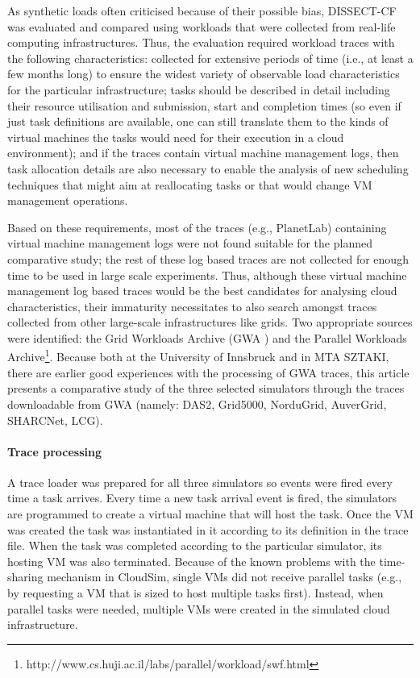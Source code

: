 \documentclass[sort, compress, 5p]{elsarticle}
\begin{document}
As synthetic loads often criticised because of their possible bias, DISSECT-CF was evaluated and compared using workloads that were collected from real-life computing infrastructures. Thus, the evaluation required workload traces with the following characteristics:  collected for extensive periods of time (i.e., at least a few months long) to ensure the widest variety of observable load characteristics for the particular infrastructure;  tasks should be described in detail including their resource utilisation and submission, start and completion times (so even if just task definitions are available, one can still translate them to the kinds of virtual machines the tasks would need for their execution in a cloud environment); and  if the traces contain virtual machine management logs, then task allocation details are also necessary to enable the analysis of new scheduling techniques that might aim at reallocating tasks or that would change VM management operations.

Based on these requirements, most of the traces (e.g., PlanetLab) containing virtual machine management logs were not found suitable for the planned comparative study; the rest of these log based traces are not collected for enough time to be used in large scale experiments. Thus, although these virtual machine management log based traces would be the best candidates for analysing cloud characteristics, their immaturity necessitates to also search amongst traces collected from other large-scale infrastructures like grids. Two appropriate sources were identified: the Grid Workloads Archive (GWA \cite{Iosup08thegrid}) and the Parallel Workloads Archive\footnote{http://www.cs.huji.ac.il/labs/parallel/workload/swf.html}. Because both at the University of Innsbruck and in MTA SZTAKI, there are earlier good experiences with the processing of GWA traces, this article presents a comparative study of the three selected simulators through the traces downloadable from GWA (namely: DAS2, Grid5000, NorduGrid, AuverGrid, SHARCNet, LCG). 

\paragraph{Trace processing} A trace loader was prepared for all three simulators so events were fired every time a task arrives. Every time a new task arrival event is fired, the simulators are programmed to create a virtual machine that will host the task. Once the VM was created the task was instantiated in it according to its definition in the trace file. When the task was completed according to the particular simulator, its hosting VM was also terminated. Because of the known problems with the time-sharing mechanism in CloudSim, single VMs did not receive parallel tasks (e.g., by requesting a VM that is sized to host multiple tasks first). Instead, when parallel tasks were needed, multiple VMs were created in the simulated cloud infrastructure.
\end{document}
